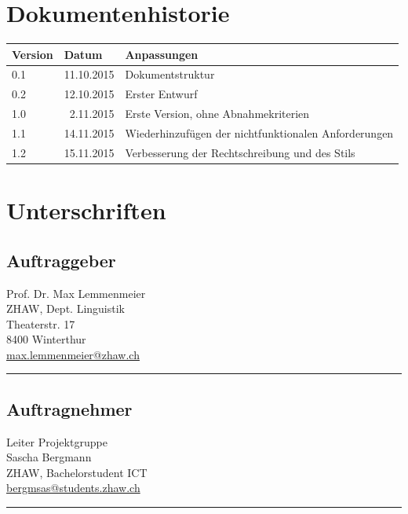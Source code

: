 \documentclass{avocado}
\title{\title}
\author{\autorA \and \autorB \and \autorC \and \autorD \and \autorD}
\newcommand{\mail}[1]{\href{mailto:#1}{#1}}
\begin{document}




\section*{Dokumentenhistorie}
\begin{tabularx}{\linewidth}{|l|r|X|} \hline
Version & \multicolumn{1}{l|}{Datum} 			& Anpassungen \\ \hline
0.1 & 11.10.2015		& Dokumentstruktur \\ \hline
0.2	& 12.10.2015       & Erster Entwurf  \\ \hline
1.0 &  2.11.2015		& Erste Version, ohne Abnahmekriterien \\ \hline
1.1 & 14.11.2015        & Wiederhinzufügen der nichtfunktionalen Anforderungen \\ \hline
1.2 & 15.11.2015        & Verbesserung der Rechtschreibung und des Stils\\ \hline
\end{tabularx}
\vfill
\section*{Unterschriften}
\begin{minipage}[t][5cm][t]{0.45\linewidth}
\subsection*{Auftraggeber}
Prof. Dr. Max Lemmenmeier \\
ZHAW, Dept. Linguistik \\
Theaterstr. 17 \\
8400 Winterthur \\
\mail{max.lemmenmeier@zhaw.ch} \\
\vfill \hrule
\end{minipage} \hfill
\begin{minipage}[t][5cm][t]{0.45\linewidth}
\subsection*{Auftragnehmer}
Leiter Projektgruppe \\
Sascha Bergmann \\
ZHAW, Bachelorstudent ICT \\
\mail{bergmsas@students.zhaw.ch} \\
\vfill \hrule
\end{minipage} \\
\clearpage
\tableofcontents
\clearpage
\end{document}
